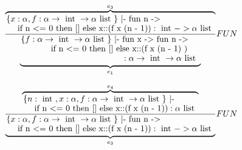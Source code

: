 \begin{equation}
	\frac
	{
        	      \overbrace{
        			\splitfrac
			{
                          	\{ x: \tautwo, f: \tauone \} \text{ |- fun n -> }
                         }
                	        {
                                 \text{ if n <= 0 then [] else x::(f x (n - 1))}: \tauthree -> \taufour
                         }
               }^{e_3}
	} 
        {
            \underbrace{
                    \splitfrac
                    { 
                            \{ f: \tauone \} \text{ |- fun x -> fun n -> }
                    } 
                    { 
                            \splitfrac
                            {
                                    \text{ if n <= 0 then [] else x::(f x (n - 1) ) }
                            }
                            {
                                    : \tauone
                            }
                    }
            }_{e_1}
	}
        {
            FUN
        }
\end{equation}

\begin{equation}
	\frac
	{
        	      \overbrace{
        			\splitfrac
			{
				\{ n: \tauthree, x: \tautwo, f: \tauone \} \text{ |- }
                         }
                	        {
                                 \text{ if n <= 0 then [] else x::(f x (n - 1))}: \taufour
                         }
               }^{e_4}
	} 
        {
        	      \underbrace{
        			\splitfrac
			{
                          	\{ x: \tautwo, f: \tauone \} \text{ |- fun n -> }
                         }
                	        {
                                 \text{ if n <= 0 then [] else x::(f x (n - 1))}: \tauthree -> \taufour
                         }
               }_{e_3}
	}
        {
            FUN
        }
\end{equation}

